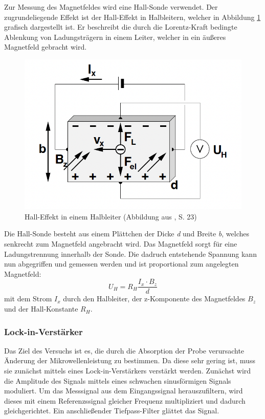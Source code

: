 \documentclass{scrartcl}
\begin{document}
Zur Messung des Magnetfeldes wird eine Hall-Sonde verwendet. Der zugrundeliegende Effekt ist der Hall-Effekt in Halbleitern, welcher in Abbildung \ref{fig:Halleffekt} grafisch dargestellt ist. Er beschreibt die durch die Lorentz-Kraft bedingte Ablenkung von Ladungsträgern in einem Leiter, welcher in ein äußeres Magnetfeld gebracht wird. 

\begin{figure}[h!]
    \centering
    \includegraphics[scale=0.35]{Halleffekt.png}
    \caption{Hall-Effekt in einem Halbleiter (Abbildung aus \cite{Grundlagen}, S. 23)}
    \label{fig:Halleffekt}
\end{figure}

Die Hall-Sonde besteht aus einem Plättchen der Dicke \textit{d} und Breite \textit{b}, welches senkrecht zum Magnetfeld angebracht wird. Das Magnetfeld sorgt für eine Ladungstrennung innerhalb der Sonde. Die dadruch entstehende Spannung kann nun abgegriffen und gemessen werden und ist proportional zum angelegten Magnetfeld:
\begin{equation}
    U_H = R_H \frac{I_x \cdot B_z}{d}
\end{equation}
mit dem Strom $I_x$ durch den Halbleiter, der z-Komponente des Magnetfeldes $B_z$ und der Hall-Konstante $R_H$.

\subsubsection{Lock-in-Verstärker}
Das Ziel des Versuchs ist es, die durch die Absorption der Probe verursachte Änderung der Mikrowellenleistung zu bestimmen. Da diese sehr gering ist, muss sie zunächst mittels eines Lock-in-Verstärkers verstärkt werden. Zunächst wird die Amplitude des Signals mittels eines schwachen sinusförmigen Signals moduliert. Um das Messsignal aus dem Eingangssignal herauszufiltern, wird dieses mit einem Referenzssignal gleicher Frequenz multipliziert und dadurch gleichgerichtet. Ein anschließender Tiefpass-Filter glättet das Signal.
\end{document}
